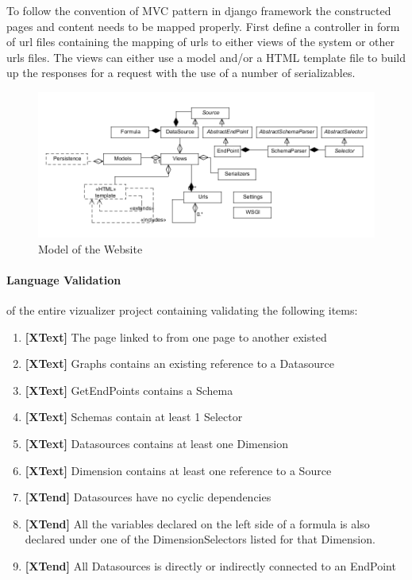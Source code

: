 To follow the convention of MVC pattern in django framework the constructed pages and
content needs to be mapped properly. First define a controller in form of url files containing
the mapping of urls to either views of the system or other urls files.
The views can either use a model and/or a HTML template file to build up the responses for a
request with the use of a number of serializables.

\begin{figure}
\begin{center}
\includegraphics[width=\linewidth]{images/websitemodel}
\end{center}
\caption{Model of the Website}
\label{fig:websitemodel}
\end{figure}

\paragraph{Language Validation}
of the entire vizualizer project containing validating the following items:
\begin{enumerate}
\item \textbf{[XText]} The page linked to from one page to another existed
\item \textbf{[XText]} Graphs contains an existing reference to a Datasource
\item \textbf{[XText]} GetEndPoints contains a Schema
\item \textbf{[XText]} Schemas contain at least 1 Selector
\item \textbf{[XText]} Datasources contains at least one Dimension
\item \textbf{[XText]} Dimension contains at least one reference to a Source
\item \textbf{[XTend]} Datasources have no cyclic dependencies
\item \textbf{[XTend]} All the variables declared on the left side of a formula is also declared under one of the DimensionSelectors listed for that Dimension.
\item \textbf{[XTend]} All Datasources is directly or indirectly connected to an EndPoint
\end{enumerate}

